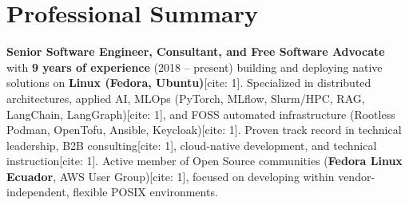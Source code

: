 \section{Professional Summary}
\small{
  \textbf{Senior Software Engineer, Consultant, and Free Software Advocate} with \textbf{9 years of experience} (2018 -- present) building and deploying native solutions on \textbf{Linux (Fedora, Ubuntu)}[cite: 1]. Specialized in distributed architectures, applied AI, MLOps (PyTorch, MLflow, Slurm/HPC, RAG, LangChain, LangGraph)[cite: 1], and FOSS automated infrastructure (Rootless Podman, OpenTofu, Ansible, Keycloak)[cite: 1]. Proven track record in technical leadership, B2B consulting[cite: 1], cloud-native development, and technical instruction[cite: 1]. Active member of Open Source communities (\textbf{Fedora Linux Ecuador}, AWS User Group)[cite: 1], focused on developing within vendor-independent, flexible POSIX environments.
}
